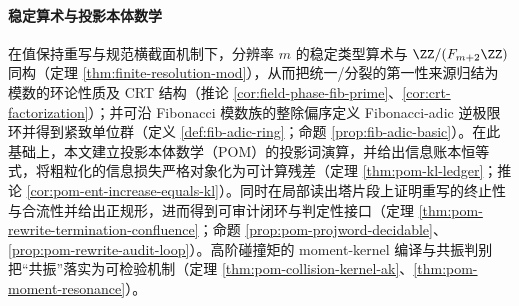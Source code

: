 \paragraph{稳定算术与投影本体数学}
在值保持重写与规范横截面机制下，分辨率 \(m\) 的稳定类型算术与 \(\ZZ/(F_{m+2}\ZZ)\) 同构（定理 \ref{thm:finite-resolution-mod}），从而把统一/分裂的第一性来源归结为模数的环论性质及 CRT 结构（推论 \ref{cor:field-phase-fib-prime}、\ref{cor:crt-factorization}）；并可沿 Fibonacci 模数族的整除偏序定义 Fibonacci-adic 逆极限环并得到紧致单位群（定义 \ref{def:fib-adic-ring}；命题 \ref{prop:fib-adic-basic}）。在此基础上，本文建立投影本体数学（POM）的投影词演算，并给出信息账本恒等式，将粗粒化的信息损失严格对象化为可计算残差（定理 \ref{thm:pom-kl-ledger}；推论 \ref{cor:pom-ent-increase-equals-kl}）。同时在局部读出塔片段上证明重写的终止性与合流性并给出正规形，进而得到可审计闭环与判定性接口（定理 \ref{thm:pom-rewrite-termination-confluence}；命题 \ref{prop:pom-projword-decidable}、\ref{prop:pom-rewrite-audit-loop}）。高阶碰撞矩的 moment-kernel 编译与共振判别把“共振”落实为可检验机制（定理 \ref{thm:pom-collision-kernel-ak}、\ref{thm:pom-moment-resonance}）。

